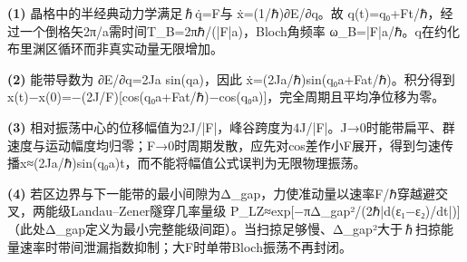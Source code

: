 \par\noindent\textbf{(1)} 晶格中的半经典动力学满足ℏq̇=F与 ẋ=(1/ℏ)∂E/∂q。故 q(t)=q₀+Ft/ℏ，经过一个倒格矢2π/a需时间T\_B=2πℏ/(|F|a)，Bloch角频率 ω\_B=|F|a/ℏ。q在约化布里渊区循环而非真实动量无限增加。
\par\noindent\textbf{(2)} 能带导数为 ∂E/∂q=2Ja sin(qa)，因此 ẋ=(2Ja/ℏ)sin(q₀a+Fat/ℏ)。积分得到 x(t)−x(0)=−(2J/F)[cos(q₀a+Fat/ℏ)−cos(q₀a)]，完全周期且平均净位移为零。
\par\noindent\textbf{(3)} 相对振荡中心的位移幅值为2J/|F|，峰谷跨度为4J/|F|。J→0时能带扁平、群速度与运动幅度均归零；F→0时周期发散，应先对cos差作小F展开，得到匀速传播x≈(2Ja/ℏ)sin(q₀a)t，而不能将幅值公式误判为无限物理振荡。
\par\noindent\textbf{(4)} 若区边界与下一能带的最小间隙为Δ\_gap，力使准动量以速率F/ℏ穿越避交叉，两能级Landau–Zener隧穿几率量级 P\_LZ≈exp[−πΔ\_gap²/(2ℏ|d(ε₁−ε₂)/dt|)]（此处Δ\_gap定义为最小完整能级间距）。当扫掠足够慢、Δ\_gap²大于ℏ扫掠能量速率时带间泄漏指数抑制；大F时单带Bloch振荡不再封闭。
